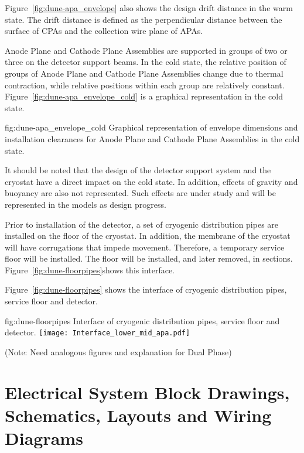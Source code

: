 Figure~\ref{fig:dune-apa_envelope} also shows the design drift
distance in the warm state. The drift distance is defined as the
perpendicular distance between the surface of CPAs and the collection
wire plane of APAs.


Anode Plane and Cathode Plane Assemblies are supported in groups of
two or three on the detector support beams.  In the cold state, the
relative position of groups of Anode Plane and Cathode Plane
Assemblies change due to thermal contraction, while relative positions
within each group are relatively
constant. Figure~\ref{fig:dune-apa_envelope_cold} is a graphical
representation in the cold state.
\begin{dunefigure}{fig:dune-apa_envelope_cold} {Graphical
    representation of envelope dimensions and installation clearances
    for Anode Plane and Cathode Plane Assemblies in the cold state.}
\end{dunefigure}

It should be noted that the design of the detector support system and
the cryostat have a direct impact on the cold state. In addition,
effects of gravity and buoyancy are also not represented. Such effects
are under study and will be represented in the models as design
progress.

Prior to installation of the detector, a set of cryogenic distribution
pipes are installed on the floor of the cryostat. In addition, the
membrane of the cryostat will have corrugations that impede
movement. Therefore, a temporary service floor will be installed. The
floor will be installed, and later removed, in sections. Figure~\ref{fig:dune-floorpipes}shows this
interface.

Figure~\ref{fig:dune-floorpipes} shows the interface of cryogenic
distribution pipes, service floor and detector.
\begin{dunefigure}{fig:dune-floorpipes} 
{Interface of cryogenic distribution pipes, service floor and detector.}
  \texttt{[image: Interface\_lower\_mid\_apa.pdf]}
\end{dunefigure}


(Note: Need analogous figures and explanation for Dual Phase)


\section{Electrical System Block Drawings, Schematics, Layouts and Wiring Diagrams}
\label{sec:fdsp-coord-electrical}


